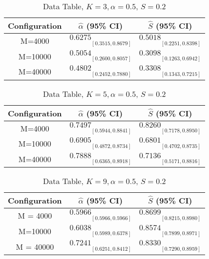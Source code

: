 \documentclass[11pt]{amsart}
\begin{document}
\begin{table}[htbp]
  \centering
  \caption{Data Table, $K =3, \alpha=0.5$, $S = 0.2$}
  \label{tab:data}
  \begin{tabular}{ccc}
    \toprule
    Configuration & $\hat{\alpha}$ (95\% CI) & $\hat{S}$ (95\% CI) \\
    \midrule
        M=4000 & $0.6275 \underset{[0.3515, 0.8679]}{}$ & $0.5018 \underset{[0.2251, 0.8398]}{}$ \\
    M=10000 & $0.5054 \underset{[0.2600, 0.8057]}{}$ & $0.3098 \underset{[0.1263, 0.6942]}{}$ \\
    M=40000 & $0.4802 \underset{[0.2452, 0.7880]}{}$ & $0.3308 \underset{[0.1343, 0.7215]}{}$ \\
    \bottomrule
  \end{tabular}
\end{table}

\begin{table}[htbp]
  \centering
  \caption{Data Table, $K =5, \alpha=0.5$, $S = 0.2$}
  \label{tab:data}
  \begin{tabular}{ccc}
    \toprule
    Configuration & $\hat{\alpha}$ (95\% CI) & $\hat{S}$ (95\% CI) \\
    \midrule
        M=4000 & $0.7497 \underset{[0.5944, 0.8841]}{}$ & $0.8260 \underset{[0.7178, 0.8950]}{}$ \\
    M=10000 & $0.6905 \underset{[0.4872, 0.8734]}{}$ & $0.6801 \underset{[0.4702, 0.8735]}{}$ \\
    M=40000 & $0.7888 \underset{[0.6365, 0.8918]}{}$ & $0.7136 \underset{[0.5171, 0.8816]}{}$ \\
    \bottomrule
  \end{tabular}
\end{table}

\begin{table}[htbp]
  \centering
  \caption{Data Table, $K =9, \alpha=0.5$, $S = 0.2$}
  \label{tab:data}
  \begin{tabular}{ccc}
    \toprule
    Configuration & $\hat{\alpha}$ (95\% CI) & $\hat{S}$ (95\% CI) \\
    \midrule
     M = 4000 & $0.5966 \underset{[0.5966, 0.5966]}{}$ & $0.8699 \underset{[0.8215, 0.8980]}{}$ \\
       M=10000 & $0.6038 \underset{[0.5989, 0.6378]}{}$ & $0.8574 \underset{[0.7899, 0.8971]}{}$ \\
    M = 40000 & $0.7241 \underset{[0.6251, 0.8412]}{}$ & $0.8330 \underset{[0.7290, 0.8959]}{}$ \\
    \bottomrule
  \end{tabular}
\end{table}
\end{document}
